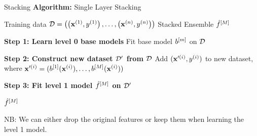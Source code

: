 \documentclass[11pt,compress,t,notes=noshow, xcolor=table]{beamer}
\begin{document}

\begin{vbframe}{Stacking}
\footnotesize
\textbf{Algorithm:} Single Layer Stacking
\begin{algorithmic}
    \Require Training data $\mathcal{D} = \left( \left(\mathbf{x}^{(1)}, y^{(1)}\right), \ldots, \left(\mathbf{x}^{(n)}, y^{(n)}\right)\right)$
    \Ensure Stacked Ensemble $\hat{f}^{[M]}$
    
    \State
    \State \textbf{Step 1: Learn level 0 base models}
        \State Fit base model $b^{[m]}$ on $\mathcal{D}$
    \EndFor
    
    \State
    \State \textbf{Step 2: Construct new dataset $\mathcal{D}^\prime$ from $\mathcal{D}$}
        \State Add $(\mathbf{x}^{\prime(i)}, y^{(i)})$ to new dataset, where $\mathbf{x}^{\prime(i)} = (b^{[1]}(\mathbf{x}^{(i)}), \ldots, b^{[M]}(\mathbf{x}^{(i)}))$
    \EndFor
    
    \State
    \State \textbf{Step 3: Fit level 1 model $\hat{f}^{[M]}$ on $\mathcal{D}^\prime$}
    
    \State \Return $\hat{f}^{[M]}$
\end{algorithmic}
NB: We can either drop the original features or keep them when learning the level 1 model.

\end{vbframe}

\end{document}
